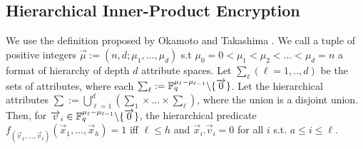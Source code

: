 \documentclass{llncs}
\begin{document}
\begin{appendix}
\section{Hierarchical Inner-Product Encryption}
We use the definition proposed by Okamoto and Takashima \cite{AC:OkaTak09}. We call a tuple of positive integers $\overrightarrow{\mu}:=(n,d;\mu_{1},...,\mu_{d})$ s.t $\mu_{0}=0<\mu_{1}<\mu_{2}<...<\mu_{d}=n$ a format of hierarchy of depth $d$ attribute spaces. Let $\sum_{\ell}(\ell=1,..,d)$ be the sets of attributes, where each $\sum_{\ell}:= \mathbb{F}^{\mu_{\ell}-\mu_{\ell-1}}_{q} \backslash \{\overrightarrow{0}\}$. Let the hierarchical attributes $\sum:=\bigcup^{d}_{\ell=1}(\sum_{1} \times ...\times \sum_{\ell})$, where the union is a disjoint union. Then, for $\overrightarrow{v}_{i} \in \mathbb{F}^{\mu_{\ell}-\mu_{\ell-1}}_{q} \backslash \{\overrightarrow{0}\}$, the hierarchical predicate $f_{(\overrightarrow{v}_{1},...,\overrightarrow{v}_{\ell})}(\overrightarrow{x}_{1},...,\overrightarrow{x}_{h})=1$ iff $\ell\leq h$ and $\overrightarrow{x}_{i}.\overrightarrow{v}_{i}=0$ for all $i$ s.t. $a\leq i \leq \ell$.\


\end{appendix}
\end{document}
